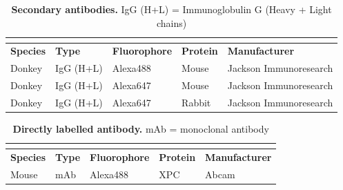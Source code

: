 \begin{table}[H]
	
\begin{center}
	\begin{tabular}{lllll}
		
		\multicolumn{5}{l}{} \\
		\hline
		\rule{0pt}{2ex}
		\hspace{-0.15cm}\textbf{Species}    &\textbf{Type} &\textbf{Fluorophore}& \textbf{Protein} & \textbf{Manufacturer} \\
		\hline
		
		Donkey & IgG (H+L) & Alexa488 & Mouse & Jackson Immunoresearch       \\
		Donkey & IgG (H+L) & Alexa647   & Mouse & Jackson Immunoresearch       \\
		Donkey & IgG (H+L) & Alexa647 & Rabbit& Jackson Immunoresearch       \\
		\hline
	\end{tabular}
	\caption{\textbf{Secondary antibodies.}  IgG (H+L) = Immunoglobulin G (Heavy + Light chains)}
	\label{tab:SecondaryAntibodies}
	\end{center}
\end{table}

\begin{table}[H]
\begin{center}
	\begin{tabular}{lllll}
		
		\multicolumn{5}{l}{} \\
		\hline
		\rule{0pt}{2ex}
		\hspace{-0.15cm}\textbf{Species}    &\textbf{Type} &\textbf{Fluorophore}& \textbf{Protein} & \textbf{Manufacturer} \\
		\hline
		Mouse & mAb & Alexa488 & XPC & Abcam       \\
		\hline
	\end{tabular}
	\caption{\textbf{Directly labelled antibody.}  mAb = monoclonal antibody}
	\label{tab:DirectlyLabeledAntibody}
	\end{center}
\end{table}

